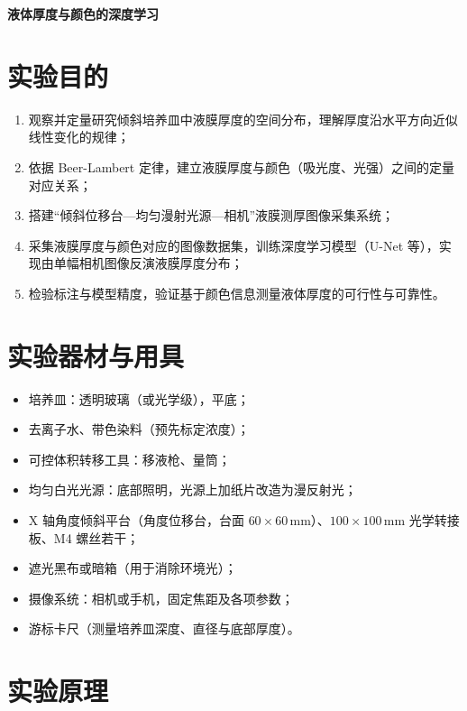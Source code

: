 \documentclass[11pt]{article}
\begin{document}
\begin{center}
	\LARGE \bf 液体厚度与颜色的深度学习
\end{center}
\section{实验目的}
\begin{enumerate}
	\item 观察并定量研究倾斜培养皿中液膜厚度的空间分布，理解厚度沿水平方向近似线性变化的规律；
	\item 依据 Beer-Lambert 定律，建立液膜厚度与颜色（吸光度、光强）之间的定量对应关系；
	\item 搭建“倾斜位移台—均匀漫射光源—相机”液膜测厚图像采集系统；
	\item 采集液膜厚度与颜色对应的图像数据集，训练深度学习模型（U-Net 等），实现由单幅相机图像反演液膜厚度分布；
	\item 检验标注与模型精度，验证基于颜色信息测量液体厚度的可行性与可靠性。
\end{enumerate}

\section{实验器材与用具}
\begin{itemize}
	\item 培养皿：透明玻璃（或光学级），平底；
	\item 去离子水、带色染料（预先标定浓度）；
	\item 可控体积转移工具：移液枪、量筒；
	\item 均匀白光光源：底部照明，光源上加纸片改造为漫反射光；
	\item X 轴角度倾斜平台（角度位移台，台面 $60\times60\,\mathrm{mm}$）、$100\times100\,\mathrm{mm}$ 光学转接板、M4 螺丝若干；
	\item 遮光黑布或暗箱（用于消除环境光）；
	\item 摄像系统：相机或手机，固定焦距及各项参数；
	\item 游标卡尺（测量培养皿深度、直径与底部厚度）。
\end{itemize}

\section{实验原理}
\end{document}
